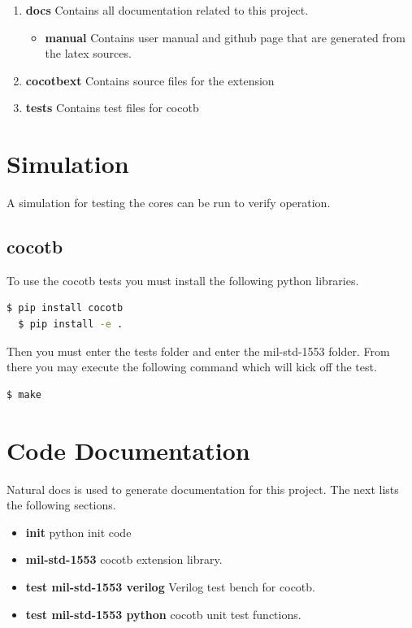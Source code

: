 \begin{enumerate}
  \item \textbf{docs} Contains all documentation related to this project.
    \begin{itemize}
      \item \textbf{manual} Contains user manual and github page that are generated from the latex sources.
    \end{itemize}
  \item \textbf{cocotbext} Contains source files for the extension
  \item \textbf{tests} Contains test files for cocotb
\end{enumerate}

\newpage

\section{Simulation}
\par
A simulation for testing the cores can be run to verify operation.

\subsection{cocotb}
\par
To use the cocotb tests you must install the following python libraries.
\begin{lstlisting}[language=bash]
  $ pip install cocotb
  $ pip install -e .
\end{lstlisting}

Then you must enter the tests folder and enter the mil-std-1553 folder. From there you may execute the following command
which will kick off the test.
\begin{lstlisting}[language=bash]
  $ make
\end{lstlisting}

\newpage

\section{Code Documentation} \label{Code Documentation}

\par
Natural docs is used to generate documentation for this project. The next lists the following sections.

\begin{itemize}
\item \textbf{init} python init code\\
\item \textbf{mil-std-1553} cocotb extension library.\\
\item \textbf{test mil-std-1553 verilog} Verilog test bench for cocotb.\\
\item \textbf{test mil-std-1553 python} cocotb unit test functions.\\
\end{itemize}


